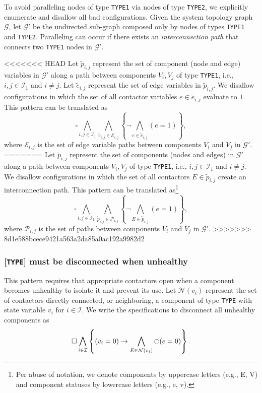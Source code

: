\documentclass[journal]{IEEEtran}
\renewcommand{\next}{\ocircle}
\newcommand{\pfr}[1]{\mathcal{#1}}
\begin{document}
To avoid paralleling nodes of type \texttt{TYPE1} via nodes of type \texttt{TYPE2}, we explicitly enumerate and disallow all bad configurations. Given the system topology graph $\pfr{G}$, let $\pfr{G}'$ be the undirected sub-graph composed only by nodes of types  \texttt{TYPE1} and \texttt{TYPE2}. 
Paralleling can occur if there exists an \emph{interconnection path} that connects two \texttt{TYPE1} nodes in $\pfr{G}'$. 

<<<<<<< HEAD
Let $\tilde{p}_{i,j}$ represent the set of component (node and edge) variables in  $\pfr{G}'$ along a path between components $V_i, V_j$ of type \texttt{TYPE1}, i.e., $i,j \in \mathcal{I}_1$ and $i \neq j$. 
Let $\tilde{e}_{i,j}$ represent the set of edge variables in $\tilde{p}_{i,j}$. We disallow configurations in which the set of all contactor variables $e \in \tilde{e}_{i,j}$ evaluate to $1$. This pattern can be translated as
%
 \begin{equation} \label{eq:noparallel}
\square \bigwedge_{i,j \in \mathcal{I}_1} \bigwedge_{\tilde{e}_{i,j} \in \mathcal{E}_{i,j}} \left\{ \lnot \bigwedge_{e \in \tilde{e}_{i,j}} ( e = 1) \right\},
 \end{equation}
 where $\mathcal{E}_{i,j}$ is the set of edge variable paths between components $V_i$ and $V_j$ in $\pfr{G}'$.
=======
Let $\tilde{p}_{i,j}$ represent the set of components (nodes and edges) in  $\pfr{G}'$ along a path between components $V_i, V_j$ of type \texttt{TYPE1}, i.e., $i,j \in \mathcal{I}_1$ and $i \neq j$. We disallow configurations in which the set of all contactors $E \in \tilde{p}_{i,j}$ create an interconnection path. This pattern can be translated as\footnote{Per abuse of notation, we denote components by uppercase letters (e.g., E, V) and component statuses by lowercase letters (e.g., e, v).}
%
 \begin{equation} \label{eq:noparallel}
\square \bigwedge_{i,j \in \mathcal{I}_1} \bigwedge_{\tilde{p}_{i,j} \in \mathcal{P}_{i,j}} \left\{ \lnot \bigwedge_{E \in \tilde{p}_{i,j}} ( e = 1) \right\},
 \end{equation}
 where $\mathcal{P}_{i,j}$ is the set of paths between components $V_i$ and $V_j$ in $\pfr{G}'$.
>>>>>>> 8d1e588bcece9421a563a2da85a0ac192a9982d2
 
 \subsubsection{[\texttt{TYPE}] must be disconnected when unhealthy}
 
This pattern requires that appropriate contactors open when a component becomes unhealthy to isolate it  and prevent its use. Let $\mathcal{N}(v_i)$ represent the set of contactors directly connected, or
 neighboring, a component of type \texttt{TYPE} with state variable $v_i$ for $i \in \mathcal{I}$.
 We write the specifications to disconnect all unhealthy components as
 \begin{equation}\label{eq:unhealthysource}
 \square \bigwedge_{i \in \mathcal{I}} \left \{ (v_i = 0) \rightarrow \bigwedge_{E \in \mathcal{N}(v_i)} \next (e = 0)\right \}.
 \end{equation}
\end{document}
